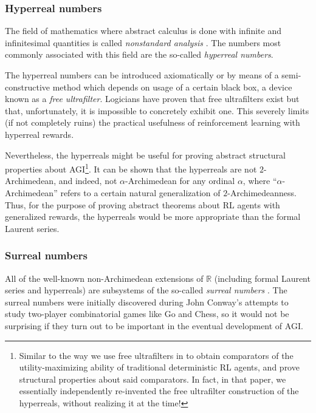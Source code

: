 \documentclass[reqno]{article}
\theoremstyle{definition}
\begin{document}
\subsubsection{Hyperreal numbers}

The field of mathematics where abstract calculus is done with infinite and infinitesimal
quantities is called \emph{nonstandard analysis} \cite{robinson}. The numbers most
commonly associated with this field are the so-called \emph{hyperreal numbers}.

The hyperreal numbers can be
introduced axiomatically or by means of a semi-constructive method which depends on
usage of a certain black box, a device known as a \emph{free ultrafilter}. Logicians
have proven that free ultrafilters exist but that, unfortunately, it is impossible to
concretely exhibit one. This severely limits (if not completely ruins) the practical
usefulness of reinforcement learning with hyperreal rewards.

Nevertheless, the hyperreals
might be useful for proving abstract structural properties about AGI\footnote{Similar to
the way we use free ultrafilters in \cite{alexander2019intelligence} to obtain
comparators of the utility-maximizing ability of traditional deterministic RL agents,
and prove structural properties about said comparators.
In fact, in that paper, we essentially independently re-invented the free ultrafilter
construction of the hyperreals, without realizing it at the time!}.
It can be shown that the hyperreals are not $2$-Archimedean, and indeed, not
$\alpha$-Archimedean for any ordinal $\alpha$, where ``$\alpha$-Archimedean'' refers to a
certain natural generalization of $2$-Archimedeanness. Thus, for the purpose of
proving abstract theorems about RL agents with generalized rewards, the hyperreals
would be more appropriate than the formal Laurent series.


\subsubsection{Surreal numbers}

All of the
well-known non-Archimedean extensions of $\mathbb R$
(including formal Laurent series and hyperreals) are subsystems of the
so-called \emph{surreal numbers}
\cite{conway} \cite{knuth} \cite{ehrlich2012absolute}. The surreal
numbers were initially discovered during John Conway's attempts to study
two-player combinatorial games like Go and Chess, so it would not be
surprising if they turn out to be important in the eventual development of
AGI.
\end{document}
